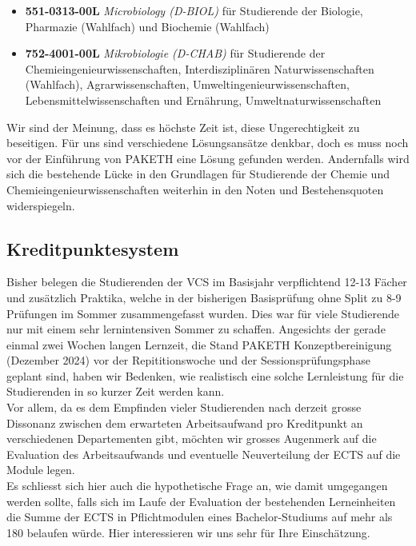 \documentclass{article}
\begin{document}
\begin{itemize}
    \item \textbf{551-0313-00L} \textit{Microbiology (D-BIOL)} für Studierende der Biologie, Pharmazie (Wahlfach) und Biochemie (Wahlfach)
    \item \textbf{752-4001-00L} \textit{Mikrobiologie (D-CHAB)} für Studierende der Chemieingenieurwissenschaften, Interdisziplinären Naturwissenschaften (Wahlfach), Agrarwissenschaften, Umweltingenieurwissenschaften, Lebensmittelwissenschaften und Ernährung, Umweltnaturwissenschaften
\end{itemize}

Wir sind der Meinung, dass es höchste Zeit ist, diese Ungerechtigkeit zu beseitigen. Für uns sind verschiedene Lösungsansätze denkbar, doch es muss noch vor der Einführung von PAKETH eine Lösung gefunden werden. Andernfalls wird sich die bestehende Lücke in den Grundlagen für Studierende der Chemie und Chemieingenieurwissenschaften weiterhin in den Noten und Bestehensquoten widerspiegeln.


\subsection{Kreditpunktesystem}
Bisher belegen die Studierenden der VCS im Basisjahr verpflichtend 12-13 Fächer und zusätzlich Praktika, welche in der bisherigen Basisprüfung ohne Split zu 8-9 Prüfungen im Sommer zusammengefasst wurden. Dies war für viele Studierende nur mit einem sehr lernintensiven Sommer zu schaffen. Angesichts der gerade einmal zwei Wochen langen Lernzeit, die Stand PAKETH Konzeptbereinigung (Dezember 2024) vor der Repititionswoche und der Sessionsprüfungsphase geplant sind, haben wir Bedenken, wie realistisch eine solche Lernleistung für die Studierenden in so kurzer Zeit werden kann.\\ 
Vor allem, da es dem Empfinden vieler Studierenden nach derzeit grosse Dissonanz zwischen dem erwarteten Arbeitsaufwand pro Kreditpunkt an verschiedenen Departementen gibt, möchten wir grosses Augenmerk auf die Evaluation des Arbeitsaufwands und eventuelle Neuverteilung der ECTS auf die Module legen.\\ 
Es schliesst sich hier auch die hypothetische Frage an, wie damit umgegangen werden sollte, falls sich im Laufe der Evaluation der bestehenden Lerneinheiten die Summe der ECTS in Pflichtmodulen eines Bachelor-Studiums auf mehr als 180 belaufen würde. Hier interessieren wir uns sehr für Ihre Einschätzung.
\end{document}
